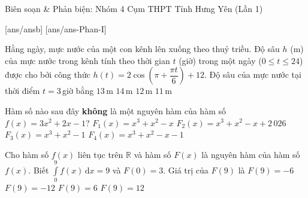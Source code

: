 \begin{name}
	{Biên soạn \& Phản biện: Nhóm 4}
	{Cụm THPT Tỉnh Hưng Yên (Lần 1)}
\end{name}
[ans/ansb\currfilebase]
\caulc
{}[ans/ans\currfilebase-Phan-I]
\begin{ex}%
	Hằng ngày, mực nước của một con kênh lên xuống theo thuỷ triều. Độ sâu $h$ (m) của mực nước trong kênh tính theo thời gian $t$ (giờ) trong một ngày ($0\le t\le 24$) được cho bởi công thức $h(t) = 2\cos \left(\pi+\dfrac{\pi t}{6}\right)+12$. Độ sâu của mực nước tại thời điểm $t=3$\,giờ bằng
	\choice
		{$13$\,m}
		{$14$\,m}
		{\True $12$\,m}
		{$11$\,m}
\end{ex}

\begin{ex}%
	Hàm số nào sau đây \textbf{không} là một nguyên hàm của hàm số $f(x)=3x^2+2x-1$?
	\choice
		{$F_1(x)=x^3+x^2-x$}
		{$F_2(x)=x^3+x^2-x+2\,026$}
		{\True $F_3(x)=x^3+x^2-1$}
		{$F_4(x)=x^3+x^2-x-1$}
\end{ex}

\begin{ex}%
	Cho hàm số $f(x)$ liên tục trên $\mathbb{R}$ và hàm số $F(x)$ là nguyên hàm của hàm số $f(x)$. Biết $\displaystyle\int\limits_0^9 f(x)\mathrm{\,d}x=9$ và $F(0)=3$. Giá trị của $F(9)$ là
	\choice
		{$F(9)=-6$}
		{$F(9)=-12$}
		{$F(9)=6$}
		{\True $F(9)=12$}
\end{ex}

